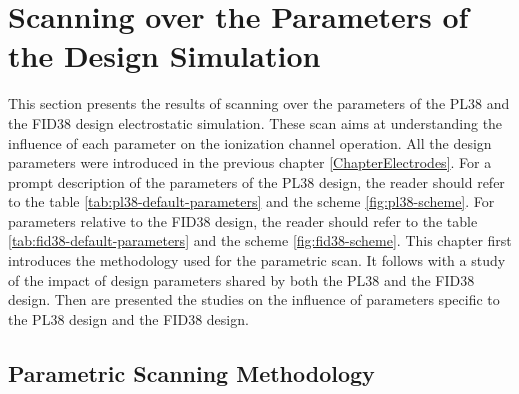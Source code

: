 
\chapter{Scanning over the Parameters of the Design Simulation} %

\label{ChapterElectrodesScan} %


This section presents the results of scanning over the parameters of the PL38 and the FID38 design electrostatic simulation. These scan aims at understanding the influence  of each parameter on the ionization channel operation. All the design parameters were introduced in the previous chapter \ref{ChapterElectrodes}. For a prompt description of the parameters of the PL38 design, the reader should refer to the table \ref{tab:pl38-default-parameters} and the scheme \ref{fig:pl38-scheme}. For parameters relative to the FID38 design, the reader should refer to the table \ref{tab:fid38-default-parameters} and the scheme \ref{fig:fid38-scheme}. 
This chapter first introduces the methodology used for the parametric scan. It follows with a study of the impact of design parameters shared by both the PL38 and the FID38 design. Then are presented the studies on the influence of parameters specific to the PL38 design and the FID38 design.


\section{Parametric Scanning Methodology}

